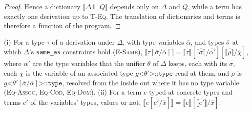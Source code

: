 \begin{proof}
Hence a dictionary $\llbracket \Delta \Vdash Q \rrbracket$ depends only on $\Delta$ and $Q$, while a term has exactly one derivation up to \textsc{T-Eq}.
The translation of dictionaries and terms is therefore a function of the program.
\end{proof}

\begin{lemma}
\label{lem:subst}
(i) For a type $\tau$ of a derivation under $\Delta$, with type variables $\overline{\alpha}$, and types $\overline{\sigma}$ at which $\Delta$'s \texttt{same\_as} constraints hold (\textsc{E-Same}), $\llbracket \tau[\overline{\sigma}/\overline{\alpha}] \rrbracket = \llbracket \tau \rrbracket[\overline{\llbracket \sigma \rrbracket}/\overline{\alpha'}][\overline{\llbracket \rho \rrbracket}/\overline{\chi}]$, where $\overline{\alpha'}$ are the type variables that the unifier $\theta$ of $\Delta$ keeps, each with its $\sigma$, each $\chi$ is the variable of an associated type $g\texttt{<}\overline{\theta'}\texttt{>::type}$ read at them, and $\rho$ is $g\texttt{<}\overline{\theta'}[\overline{\sigma}/\overline{\alpha}]\texttt{>::type}$, resolved from the inside out where it has no type variable (\textsc{Eq-Assoc}, \textsc{Eq-Cod}, \textsc{Eq-Dom}).
(ii) For a term $e$ typed at concrete types and terms $\overline{e'}$ of the variables' types, values or not, $\llbracket e[\overline{e'}/\overline{x}] \rrbracket = \llbracket e \rrbracket[\overline{\llbracket e' \rrbracket}/\overline{x}]$.
\end{lemma}

